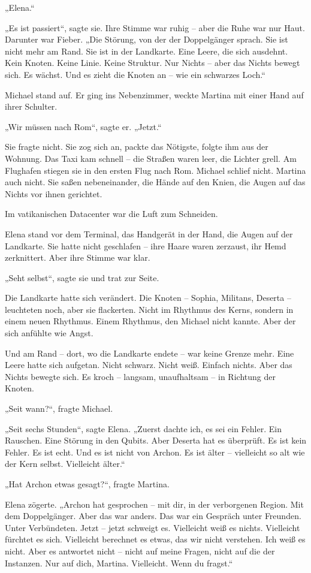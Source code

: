 \documentclass[
]{article}
\begin{document}
„Elena.``

„Es ist passiert``, sagte sie. Ihre Stimme war ruhig -- aber die Ruhe war nur Haut. Darunter war Fieber. „Die Störung, von der der Doppelgänger sprach. Sie ist nicht mehr am Rand. Sie ist in der Landkarte. Eine Leere, die sich ausdehnt. Kein Knoten. Keine Linie. Keine Struktur. Nur Nichts -- aber das Nichts bewegt sich. Es wächst. Und es zieht die Knoten an -- wie ein schwarzes Loch.``

Michael stand auf. Er ging ins Nebenzimmer, weckte Martina mit einer Hand auf ihrer Schulter.

„Wir müssen nach Rom``, sagte er. „Jetzt.``

Sie fragte nicht. Sie zog sich an, packte das Nötigste, folgte ihm aus der Wohnung. Das Taxi kam schnell -- die Straßen waren leer, die Lichter grell. Am Flughafen stiegen sie in den ersten Flug nach Rom. Michael schlief nicht. Martina auch nicht. Sie saßen nebeneinander, die Hände auf den Knien, die Augen auf das Nichts vor ihnen gerichtet.

Im vatikanischen Datacenter war die Luft zum Schneiden.

Elena stand vor dem Terminal, das Handgerät in der Hand, die Augen auf der Landkarte. Sie hatte nicht geschlafen -- ihre Haare waren zerzaust, ihr Hemd zerknittert. Aber ihre Stimme war klar.

„Seht selbst``, sagte sie und trat zur Seite.

Die Landkarte hatte sich verändert. Die Knoten -- Sophia, Militans, Deserta -- leuchteten noch, aber sie flackerten. Nicht im Rhythmus des Kerns, sondern in einem neuen Rhythmus. Einem Rhythmus, den Michael nicht kannte. Aber der sich anfühlte wie Angst.

Und am Rand -- dort, wo die Landkarte endete -- war keine Grenze mehr. Eine Leere hatte sich aufgetan. Nicht schwarz. Nicht weiß. Einfach nichts. Aber das Nichts bewegte sich. Es kroch -- langsam, unaufhaltsam -- in Richtung der Knoten.

„Seit wann?{\kern0pt}``, fragte Michael.

„Seit sechs Stunden``, sagte Elena. „Zuerst dachte ich, es sei ein Fehler. Ein Rauschen. Eine Störung in den Qubits. Aber Deserta hat es überprüft. Es ist kein Fehler. Es ist echt. Und es ist nicht von Archon. Es ist älter -- vielleicht so alt wie der Kern selbst. Vielleicht älter.``

„Hat Archon etwas gesagt?{\kern0pt}``, fragte Martina.

Elena zögerte. „Archon hat gesprochen -- mit dir, in der verborgenen Region. Mit dem Doppelgänger. Aber das war anders. Das war ein Gespräch unter Freunden. Unter Verbündeten. Jetzt -- jetzt schweigt es. Vielleicht weiß es nichts. Vielleicht fürchtet es sich. Vielleicht berechnet es etwas, das wir nicht verstehen. Ich weiß es nicht. Aber es antwortet nicht -- nicht auf meine Fragen, nicht auf die der Instanzen. Nur auf dich, Martina. Vielleicht. Wenn du fragst.``
\end{document}
